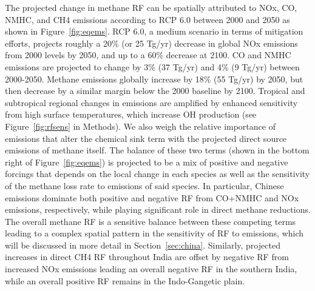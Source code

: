The projected change in methane RF can be spatially attributed to NOx, CO, NMHC, and CH4 emissions according to RCP 6.0 between 2000 and 2050 as shown in Figure~\ref{fig:eqems}. RCP 6.0, a medium scenario in terms of mitigation efforts, projects roughly a 20\% (or 25 Tg/yr) decrease in global NOx emissions from 2000 levels by 2050, and up to a 60\% decrease at 2100. CO and NMHC emissions are projected to change by 3\% (37 Tg/yr) and 4\% (9 Tg/yr) between 2000-2050. Methane emissions globally increase by 18\% (55 Tg/yr) by 2050, but then decrease by a similar margin below the 2000 baseline by 2100. Tropical and subtropical regional changes in emissions are amplified by enhanced sensitivity from high surface temperatures, which increase OH production (see Figure~\ref{fig:rfsens} in Methods). We also weigh the relative importance of emissions that alter the chemical sink term with the projected direct source emissions of methane itself. The balance of these two terms (shown in the bottom right of Figure~\ref{fig:eqems}) is projected to be a mix of positive and negative forcings that depends on the local change in each species as well as the sensitivity of the methane loss rate to emissions of said species. In particular, Chinese emissions dominate both positive and negative RF from CO+NMHC and NOx emissions, respectively, while playing significant role in direct methane reductions.  The overall methane RF is a sensitive balance between these competing terms leading to a complex spatial pattern in the sensitivity of RF to emissions, which will be discussed in more detail in Section~\ref{sec:china}.  Similarly, projected increases in direct CH4 RF throughout India are offset by negative RF from increased NOx emissions leading an overall negative RF in the southern India, while an overall positive RF remains in the Indo-Gangetic plain.  

